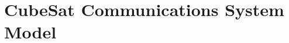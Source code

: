 \documentclass[conf]{new-aiaa}
\begin{document}








\section{CubeSat Communications System Model} \label{CCSM}
\end{document}
